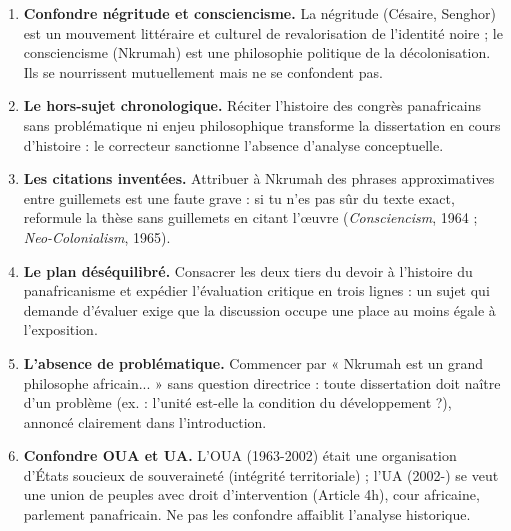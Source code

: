 \documentclass[11pt]{article}
\begin{document}
\begin{attention}
\begin{enumerate}
\item \textbf{Confondre négritude et consciencisme.} La négritude (Césaire, Senghor) est un mouvement littéraire et culturel de revalorisation de l'identité noire ; le consciencisme (Nkrumah) est une philosophie politique de la décolonisation. Ils se nourrissent mutuellement mais ne se confondent pas.
\item \textbf{Le hors-sujet chronologique.} Réciter l'histoire des congrès panafricains sans problématique ni enjeu philosophique transforme la dissertation en cours d'histoire : le correcteur sanctionne l'absence d'analyse conceptuelle.
\item \textbf{Les citations inventées.} Attribuer à Nkrumah des phrases approximatives entre guillemets est une faute grave : si tu n'es pas sûr du texte exact, reformule la thèse sans guillemets en citant l'œuvre (\emph{Consciencism}, 1964 ; \emph{Neo-Colonialism}, 1965).
\item \textbf{Le plan déséquilibré.} Consacrer les deux tiers du devoir à l'histoire du panafricanisme et expédier l'évaluation critique en trois lignes : un sujet qui demande d'évaluer exige que la discussion occupe une place au moins égale à l'exposition.
\item \textbf{L'absence de problématique.} Commencer par « Nkrumah est un grand philosophe africain... » sans question directrice : toute dissertation doit naître d'un problème (ex. : l'unité est-elle la condition du développement ?), annoncé clairement dans l'introduction.
\item \textbf{Confondre OUA et UA.} L'OUA (1963-2002) était une organisation d'États soucieux de souveraineté (intégrité territoriale) ; l'UA (2002-) se veut une union de peuples avec droit d'intervention (Article 4h), cour africaine, parlement panafricain. Ne pas les confondre affaiblit l'analyse historique.
\end{enumerate}
\end{attention}
\end{document}
